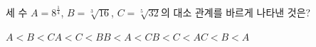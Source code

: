 세 수 $A=8^{\frac{1}{4}}$, $B=\sqrt[3]{16}$, $C=\sqrt[5]{32}$의 대소 관계를 바르게 나타낸 것은?
\begin{choices32}{$A<B<C$}{$A<C<B$}{$B<A<C$}{$B<C<A$}{$C<B<A$}\end{choices32}
